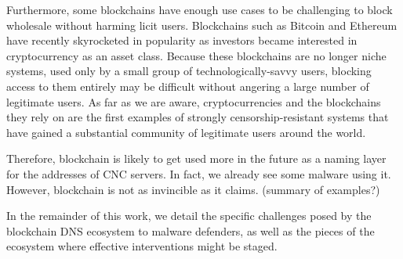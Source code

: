 \documentclass[10pt,sigconf,letterpaper]{acmart}
\begin{document}
Furthermore, some blockchains have enough use cases to be challenging to block wholesale without 
harming licit users. Blockchains such as Bitcoin and Ethereum have recently 
skyrocketed in popularity as investors became interested in cryptocurrency as 
an asset class. Because these blockchains are no longer niche systems, used only by a small group 
of technologically-savvy users, blocking access 
to them entirely may be difficult without angering a large number of 
legitimate users. As far as we are aware, cryptocurrencies and the blockchains 
they rely on are the first examples of strongly censorship-resistant systems 
that have gained a substantial community of legitimate users around the world.

Therefore, blockchain is likely to get used more in the future as a naming 
layer for the addresses of CNC servers. In fact, we already see some malware 
using it. However, blockchain is not as invincible as it claims. (summary of 
examples?)

In the remainder of this work, we detail the specific 
challenges posed by the blockchain DNS ecosystem to malware 
defenders, as well as the pieces of the ecosystem where 
effective interventions might be staged.




\end{document}
